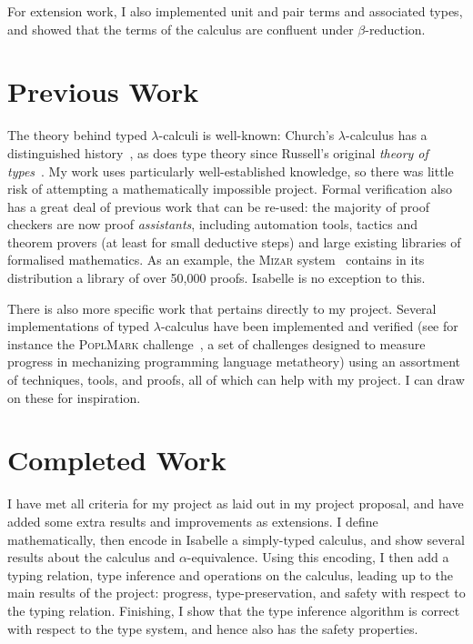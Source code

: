 For extension work, I also implemented unit and pair terms and associated types, and showed that the terms of the calculus are confluent under \(\beta\)-reduction.

\section{Previous Work}
The theory behind typed \(\lambda\)-calculi is well-known: Church's \(\lambda\)-calculus has a distinguished history~\cite{lambda-history}, as does type theory since Russell's original \emph{theory of types}~\cite{russell}.
My work uses particularly well-established knowledge, so there was little risk of attempting a mathematically impossible project.
Formal verification also has a great deal of previous work that can be re-used: the majority of proof checkers are now proof \emph{assistants}, including automation tools, tactics and theorem provers (at least for small deductive steps) and large existing libraries of formalised mathematics.
As an example, the \textsc{Mizar} system~\cite{mizar} contains in its distribution a library of over 50,000 proofs.
Isabelle is no exception to this.

There is also more specific work that pertains directly to my project.
Several implementations of typed \(\lambda\)-calculus have been implemented and verified (see for instance the \textsc{PoplMark} challenge~\cite{poplmark}, a set of challenges designed to measure progress in mechanizing programming language metatheory) using an assortment of techniques, tools, and proofs, all of which can help with my project.
I can draw on these for inspiration.

\section{Completed Work}
I have met all criteria for my project as laid out in my project proposal, and have added some extra results and improvements as extensions.
I define mathematically, then encode in Isabelle a simply-typed calculus, and show several results about the calculus and \(\alpha\)-equivalence.
Using this encoding, I then add a typing relation, type inference and operations on the calculus, leading up to the main results of the project: progress, type-preservation, and safety with respect to the typing relation.
Finishing, I show that the type inference algorithm is correct with respect to the type system, and hence also has the safety properties.
